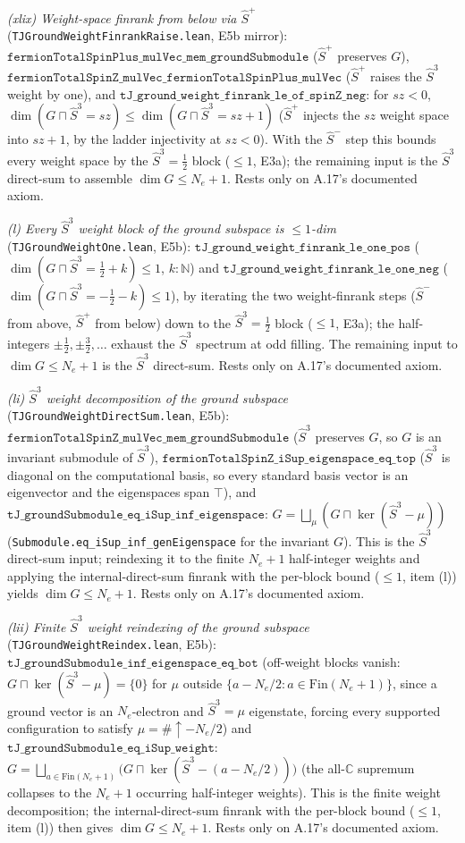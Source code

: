 \documentclass[a4paper,11pt]{article}
\begin{document}
\emph{(xlix) Weight-space finrank from below via $\hat S^+$} (\texttt{TJGroundWeightFinrankRaise.lean},
E5b mirror): $\texttt{fermionTotalSpinPlus\_mulVec\_mem\_groundSubmodule}$ ($\hat S^+$ preserves $G$),
$\texttt{fermionTotalSpinZ\_mulVec\_fermionTotalSpinPlus\_mulVec}$ ($\hat S^+$ raises the $\hat S^3$
weight by one), and $\texttt{tJ\_ground\_weight\_finrank\_le\_of\_spinZ\_neg}$: for $sz<0$,
$\dim(G\sqcap\hat S^3{=}sz)\le\dim(G\sqcap\hat S^3{=}sz{+}1)$ ($\hat S^+$ injects the $sz$ weight space
into $sz{+}1$, by the ladder injectivity at $sz<0$).  With the $\hat S^-$ step this bounds every weight
space by the $\hat S^3=\tfrac12$ block ($\le 1$, E3a); the remaining input is the $\hat S^3$ direct-sum
to assemble $\dim G\le N_e+1$.  Rests only on A.17's documented axiom.

\emph{(l) Every $\hat S^3$ weight block of the ground subspace is $\le 1$-dim}
(\texttt{TJGroundWeightOne.lean}, E5b): $\texttt{tJ\_ground\_weight\_finrank\_le\_one\_pos}$
($\dim(G\sqcap\hat S^3{=}\tfrac12{+}k)\le 1$, $k:\mathbb N$) and
$\texttt{tJ\_ground\_weight\_finrank\_le\_one\_neg}$ ($\dim(G\sqcap\hat S^3{=}{-}\tfrac12{-}k)\le 1$),
by iterating the two weight-finrank steps ($\hat S^-$ from above, $\hat S^+$ from below) down to the
$\hat S^3=\tfrac12$ block ($\le 1$, E3a); the half-integers $\pm\tfrac12,\pm\tfrac32,\dots$ exhaust the
$\hat S^3$ spectrum at odd filling.  The remaining input to $\dim G\le N_e+1$ is the $\hat S^3$
direct-sum.  Rests only on A.17's documented axiom.

\emph{(li) $\hat S^3$ weight decomposition of the ground subspace}
(\texttt{TJGroundWeightDirectSum.lean}, E5b):
$\texttt{fermionTotalSpinZ\_mulVec\_mem\_groundSubmodule}$ ($\hat S^3$ preserves $G$, so $G$ is an
invariant submodule of $\hat S^3$),
$\texttt{fermionTotalSpinZ\_iSup\_eigenspace\_eq\_top}$ ($\hat S^3$ is diagonal on the computational
basis, so every standard basis vector is an eigenvector and the eigenspaces span $\top$), and
$\texttt{tJ\_groundSubmodule\_eq\_iSup\_inf\_eigenspace}$: $G=\bigsqcup_\mu (G\sqcap\ker(\hat
S^3-\mu))$ (\texttt{Submodule.eq\_iSup\_inf\_genEigenspace} for the invariant $G$).  This is the
$\hat S^3$ direct-sum input; reindexing it to the finite $N_e+1$ half-integer weights and applying
the internal-direct-sum finrank with the per-block bound ($\le 1$, item (l)) yields
$\dim G\le N_e+1$.  Rests only on A.17's documented axiom.

\emph{(lii) Finite $\hat S^3$ weight reindexing of the ground subspace}
(\texttt{TJGroundWeightReindex.lean}, E5b):
$\texttt{tJ\_groundSubmodule\_inf\_eigenspace\_eq\_bot}$ (off-weight blocks vanish: $G\sqcap\ker(\hat
S^3-\mu)=\{0\}$ for $\mu$ outside $\{a-N_e/2 : a\in\mathrm{Fin}(N_e{+}1)\}$, since a ground vector is
an $N_e$-electron and $\hat S^3{=}\mu$ eigenstate, forcing every supported configuration to satisfy
$\mu=\#{\uparrow}-N_e/2$) and $\texttt{tJ\_groundSubmodule\_eq\_iSup\_weight}$:
$G=\bigsqcup_{a\in\mathrm{Fin}(N_e+1)}\bigl(G\sqcap\ker(\hat S^3-(a-N_e/2))\bigr)$ (the all-$\mathbb
C$ supremum collapses to the $N_e+1$ occurring half-integer weights).  This is the finite weight
decomposition; the internal-direct-sum finrank with the per-block bound ($\le 1$, item (l)) then
gives $\dim G\le N_e+1$.  Rests only on A.17's documented axiom.
\end{document}
